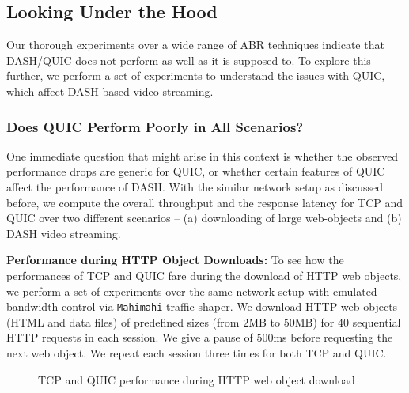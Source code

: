 \subsection{Looking Under the Hood}
Our thorough experiments over a wide range of ABR techniques indicate that DASH/QUIC does not perform as well as it is supposed to. To explore this further, we perform a set of experiments to understand the issues with QUIC, which affect DASH-based video streaming.

\subsubsection{Does QUIC Perform Poorly in All Scenarios?}
One immediate question that might arise in this context is whether the observed performance drops are generic for QUIC, or whether certain features of QUIC affect the performance of DASH. With the similar network setup as discussed before, we compute the overall throughput and the response latency for TCP and QUIC over two different scenarios -- (a) downloading of large web-objects and (b) DASH video streaming.

\newcommand{\subsubsubsection}[1]{\textbf{#1: }}
\subsubsubsection{Performance during HTTP Object Downloads}
To see how the performances of TCP and QUIC fare during the download of HTTP web objects, we perform a set of experiments over the same network setup with emulated bandwidth control via {\tt Mahimahi} traffic shaper. We download HTTP web objects (HTML and data files) of predefined sizes (from $2$MB to $50$MB) for $40$ sequential HTTP requests in each session. We give a pause of $500$ms before requesting the next web object. We repeat each session three times for both TCP and QUIC. 


\begin{figure}[!ht]
	\captionsetup[subfigure]{}
	\begin{center}
	\end{center}
	\caption{\label{fig:chap03s2:proofLargeFile}TCP and QUIC performance during HTTP web object download}
\end{figure}


